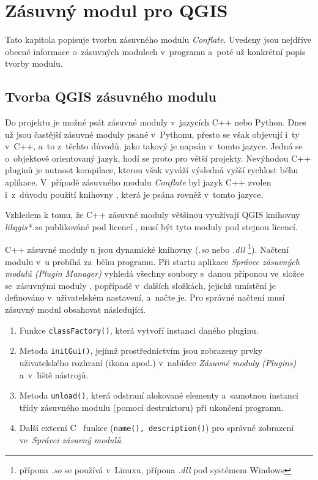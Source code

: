 \chapter{Zásuvný modul pro QGIS}
\label{6-plugin}

Tato kapitola popisuje tvorbu zásuvného modulu \textit{Conflate}.
Uvedeny jsou nejdříve obecné informace o~zásuvných modulech v~programu
 a~poté už kon\-krétní popis tvorby modulu. 

\section{Tvorba QGIS zásuvného modulu}
\label{plugin-tvorba}

Do projektu  je možné psát zásuvné moduly v~jazycích C++ 
nebo Python. Dnes už jsou častější zásuvné moduly psané v~Pythonu, přesto 
se však objevují i~ty v~C++, a~to z~těchto důvodů.  jako takový 
je napsán v~tomto jazyce. Jedná se o~objektově orientovaný jazyk, hodí se 
proto pro větší projekty. Nevýhodou C++ pluginů je nutnost kompilace, kterou 
však vyváží výsledná vyšší rychlost běhu aplikace. V~případě zásuvného modulu 
\textit{Conflate} byl jazyk C++ zvolen i~z~důvodu použití knihovny , 
která je psána rovněž v~tomto jazyce.

Vzhledem k tomu, že C++ zásuvné moduly většinou využívají QGIS knihovny
\textit{libqgis*.so} publikováné pod licencí , musí být 
tyto moduly pod stejnou licencí.

C++ zásuvné moduly u jsou dynamické knihovny (\textit{.so} nebo 
\textit{.dll} \footnote{ přípona \textit{.so} se používá v~Linuxu, přípona 
\textit{.dll} pod systémem Windows}). Načtení modulu v~u probíhá 
za~běhu programu. Při startu aplikace \textit{Správce zásuvných modulů 
(Plugin Manager)} vyhledá všechny soubory s~danou příponou ve~složce 
se~zásuvnými moduly , popřípadě v~dalších složkách, jejichž umístění
je definováno v~uživatelském nastavení, a~načte je. Pro správné načtení musí 
zásuvný modul obsahovat následující.

\begin{enumerate}
 \item Funkce \texttt{classFactory()}, která vytvoří instanci daného pluginu.
 \item Metoda \texttt{initGui()}, jejímž prostřednictvím jsou zobrazeny prvky 
	uživatelského rozhraní (ikona apod.) v~nabídce \textit{Zásuvné moduly 
	(Plugins)} a~v~liště nástrojů.
 \item Metoda \texttt{unload()}, která odstraní alokované elementy a~samotnou
	instanci třídy zásuvného modulu (pomocí destruktoru) při ukončení 
	programu.
 \item Další externí C ~funkce (\texttt{na\-me(), descrip\-tion()}) pro správné
	zobrazení ve~\textit{Správci zásuvný modulů}.
\end{enumerate}

